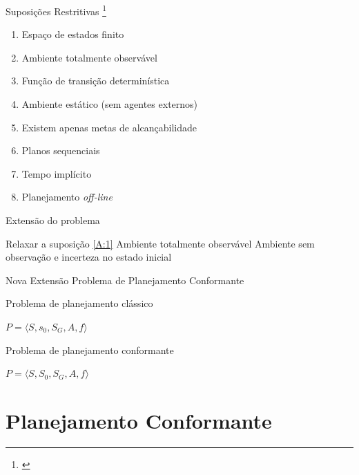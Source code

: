 \begin{frame}{Suposições Restritivas \footnote{\cite{Ghallab:2004}}}
    \begin{enumerate}
        \item Espaço de estados finito 
        \item Ambiente totalmente observável \label{A:1}
        \item Função de transição determinística 
        \item Ambiente estático (sem agentes externos)
        \item Existem apenas metas de alcançabilidade 
        \item Planos sequenciais
        \item Tempo implícito
        \item Planejamento \textit{off-line}
    \end{enumerate}
    
\end{frame}

\begin{frame}{Extensão do problema}
    \begin{block}{Relaxar a suposição \ref{A:1} Ambiente totalmente observável}
        Ambiente sem observação e incerteza no estado inicial
    \end{block}
    
    \begin{block}{Nova Extensão}
        Problema de Planejamento Conformante
    \end{block}
    \pause
    \begin{block}{Problema de planejamento clássico}
        \begin{center}
            $P = \langle S, s_0, S_G, A, f \rangle$
        \end{center}
    \end{block}
    
    \begin{block}{Problema de planejamento conformante}
        \begin{center}
            $P = \langle S, S_0, S_G, A, f \rangle$
        \end{center}
    \end{block}
\end{frame}




\section{Planejamento Conformante}

